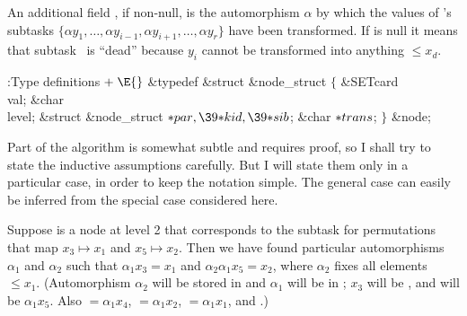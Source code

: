 An additional field , if non-null, is the automorphism $%
\alpha$ by
which the values of 's subtasks $\{\alpha y_1,\ldots,\alpha y_{i-1},
\alpha y_{i+1},\ldots,\alpha y_r\}$ have been transformed. If 
is null it means that subtask~ is ``dead'' because $y_i$ cannot be
transformed into anything $\le x_d$.

\Y\B\4:Type definitions\X${}\mathrel+\E{}$\6
\&{typedef} \&{struct} \&{node\_struct} ${}\{{}$\1\6
\&{SETcard} \\{val};\6
\&{char} \\{level};\6
\&{struct} \&{node\_struct} ${}{*}\\{par},\39{*}\\{kid},\39{*}\\{sib}{}$;\6
\&{char} ${}{*}\\{trans}{}$;\2\6
${}\}{}$ \&{node};\par
\fi

Part of the algorithm is somewhat subtle and requires proof, so I shall
try
to state the inductive assumptions carefully. But I will state them only in a
particular case, in order to keep the notation simple. The general case can
easily be inferred from the special case considered here.

Suppose  is a node at level 2 that corresponds to the subtask for
permutations that map $x_3\mapsto x_1$ and $x_5\mapsto x_2$. Then we have
found particular
automorphisms $\alpha_1$ and $\alpha_2$ such that $\alpha_1 x_3=x_1$
and $\alpha_2\alpha_1 x_5=x_2$, where $\alpha_2$ fixes all elements $\le x_1$.
(Automorphism $\alpha_2$ will be stored in  and $%
\alpha_1$ will
be in ; $x_3$ will be , and  will
be $\alpha_1x_5$. Also
${}=\alpha_1x_4$,
${}=\alpha_1x_2$,
${}=\alpha_1x_1$, and
.)

